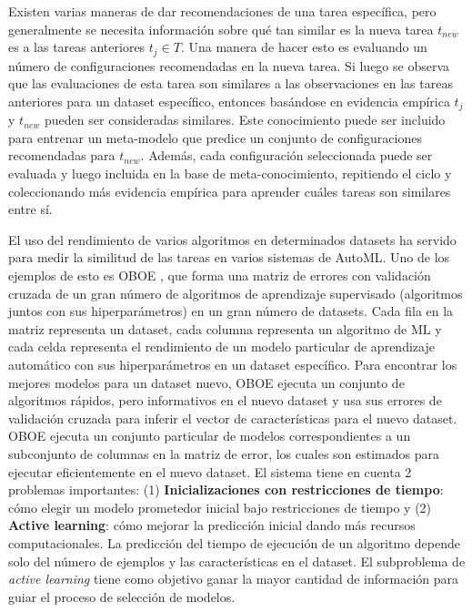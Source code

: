 \documentclass[a4paper,10pt,twocolumn]{article}
\begin{document}
Existen varias maneras de dar recomendaciones de una tarea específica, pero generalmente se necesita información sobre qué tan similar es la nueva tarea  $t_{new}$ es a las tareas anteriores $t_j \in T$. Una manera de hacer esto es evaluando un número de configuraciones recomendadas en la nueva tarea. Si luego se observa que las evaluaciones de esta tarea son similares a las observaciones en las tareas anteriores para un dataset específico, entonces basándose en evidencia empírica $t_j$ y $t_{new}$ pueden ser consideradas similares. Este conocimiento puede ser incluido para entrenar un meta-modelo que predice un conjunto de configuraciones recomendadas para $t_{new}$. Además, cada configuración seleccionada puede ser evaluada y luego incluida en la base de meta-conocimiento, repitiendo el ciclo y coleccionando más evidencia empírica para aprender cuáles tareas son similares entre sí.

El uso del rendimiento de varios algoritmos en determinados datasets ha servido para medir la similitud de las tareas en varios sistemas de AutoML. Uno de los ejemplos de esto es OBOE \cite{yang2018oboe}, que forma una matriz de errores con validación cruzada de un gran número de algoritmos de aprendizaje supervisado (algoritmos juntos con sus hiperparámetros) en un gran número de datasets. Cada fila  en la matriz representa un dataset, cada columna representa un algoritmo de ML y cada celda representa el rendimiento de un modelo particular de aprendizaje automático con sus hiperparámetros en un dataset específico. Para encontrar los mejores modelos para un dataset nuevo, OBOE ejecuta un conjunto de algoritmos rápidos, pero informativos en el nuevo dataset y usa sus errores de validación cruzada para inferir el vector de características para el nuevo dataset. 
OBOE ejecuta un conjunto particular de modelos correspondientes a un subconjunto de columnas en la matriz de error, los cuales son estimados para ejecutar eficientemente en el nuevo dataset. El sistema tiene en cuenta 2 problemas importantes: (1) \textbf{Inicializaciones con restricciones de tiempo}: cómo elegir un modelo prometedor inicial bajo restricciones de tiempo y (2) \textbf{Active learning}: cómo mejorar la predicción inicial dando más recursos computacionales. La predicción del tiempo de ejecución de un algoritmo depende solo del número de ejemplos y las características en el dataset. El subproblema de \textit{active learning} tiene como objetivo ganar la mayor cantidad de información para guiar el proceso de selección de modelos.
\end{document}

